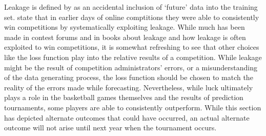 Leakage is defined by \cite{schutt2013doing} as an accidental inclusion of `future' data into the training set. \cite{schutt2013doing} state that in earlier days of online comptitions they were able to consistently win competitions by systematically exploiting leakage. While much has been made in contest forums and in books  about leakage and how leakage is often exploited to win competitions, it is somewhat refreshing to see that other choices like the loss function play into the relative results of a competition. While leakage might be the result of competition administrators' errors, or a misunderstanding of the data generating process, the loss function should be chosen to match the reality of the errors made while forecasting. Nevertheless, while luck ultimately plays a role in the basketball games themselves and the results of prediction tournaments, some players are able to consistently outperform. While this section has depicted alternate outcomes that could have occurred, an actual alternate outcome will not arise until next year when the tournament occurs.  


